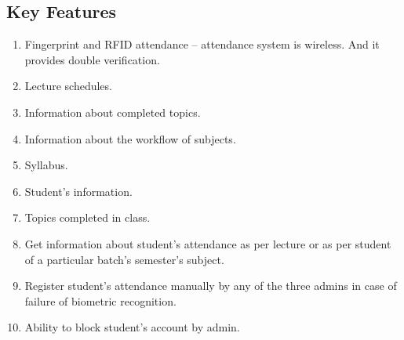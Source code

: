 \subsection{Key Features}
\begin{enumerate}
    \item Fingerprint and RFID attendance – attendance system is wireless. And it provides double verification.
    \item Lecture schedules.
    \item Information about completed topics.
    \item Information about the workflow of subjects.
    \item Syllabus.
    \item Student's information.
    \item Topics completed in class.
    \item Get information about student's attendance as per lecture or as per student of a particular batch's semester's subject.
    \item Register student's attendance manually by any of the three admins in case of failure of biometric recognition.
    \item Ability to block student's account by admin.
\end{enumerate}